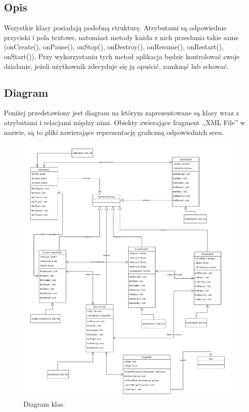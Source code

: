 \documentclass[15pt]{article}
\begin{document}
  \subsection{Opis}
  Wszystkie klasy posiadają podobną strukturę. Atrybutami są odpowiednie przyciski i pola textowe, natomiast metody każda z nich przesłania takie same (onCreate(), onPause(), onStop(), onDestroy(), onResume(), onRestart(), onStart()). Przy wykorzystaniu tych metod aplikacja będzie kontrolować swoje działanie, jeżeli użytkownik zdecyduje się ją opuścić, zamknąć lub schować.
 
  \subsection{Diagram}
  Poniżej przedstawiony jest diagram na którym zaprezentowane są klasy wraz z atrybutami i relacjami między nimi. Obiekty zwierające fragment ,,XML File'' w nazwie, są to pliki zawierające reprezentację graficzną odpowiednich scen.
  \begin{figure}
    \includegraphics[width=\linewidth]{diagram}
    \caption{Diagram klas.}
    \label{fig:diagram}
  \end{figure}
\end{document}
